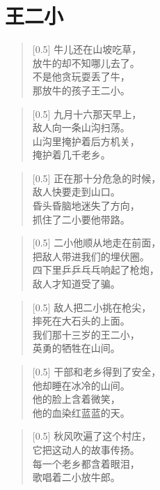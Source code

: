 \documentclass[12pt,UTF-8,openany]{ctexbook}
\begin{document}
\chapter{王二小}

\begin{Large}
    
    \begin{verse}[0.5\linewidth]
        牛儿还在山坡吃草， \\
        放牛的却不知哪儿去了。 \\
        不是他贪玩耍丢了牛， \\
        那放牛的孩子王二小。
    \end{verse}
    
    
    \begin{verse}[0.5\linewidth]
        九月十六那天早上， \\
        敌人向一条山沟扫荡。 \\
        山沟里掩护着后方机关， \\
        掩护着几千老乡。
    \end{verse}
    
    
    \begin{verse}[0.5\linewidth]
        正在那十分危急的时候， \\
        敌人快要走到山口。 \\
        昏头昏脑地迷失了方向， \\
        抓住了二小要他带路。
    \end{verse}
    
    
    \begin{verse}[0.5\linewidth]
        二小他顺从地走在前面， \\
        把敌人带进我们的埋伏圈。 \\
        四下里乒乒乓乓响起了枪炮， \\
        敌人才知道受了骗。
    \end{verse}
    
    
    \begin{verse}[0.5\linewidth]
        敌人把二小挑在枪尖， \\
        摔死在大石头的上面。 \\
        我们那十三岁的王二小， \\
        英勇的牺牲在山间。
    \end{verse}
    
    
    \begin{verse}[0.5\linewidth]
        干部和老乡得到了安全， \\
        他却睡在冰冷的山间。 \\
        他的脸上含着微笑， \\
        他的血染红蓝蓝的天。
    \end{verse}
    
    
    \begin{verse}[0.5\linewidth]
        秋风吹遍了这个村庄， \\
        它把这动人的故事传扬。 \\
        每一个老乡都含着眼泪， \\
        歌唱着二小放牛郎。
    \end{verse}
    
\end{Large}
\end{document}
